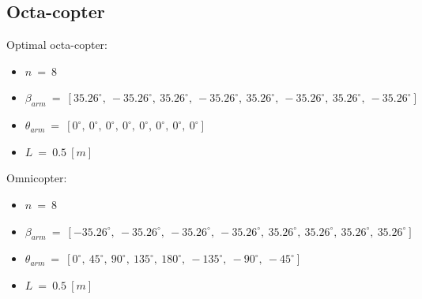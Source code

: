 \begin{table}[!h]
\begin{center}
 \caption{Comparison between two designs' hover capabilities.}\vspace{1ex}
 \label{tab:tab_Hexa_compare_hover}
\end{center}
\end{table}

\subsection{Octa-copter}
\label{sec:octa_copter}

Optimal octa-copter:
\begin{itemize}
  \item $n\ =\ 8$
  \item $\beta_{arm}\ =\ [35.26^{\circ},\  -35.26^{\circ},\  35.26^{\circ},\  -35.26^{\circ},\
                          35.26^{\circ},\  -35.26^{\circ},\ 35.26^{\circ},\  -35.26^{\circ}]$
  \item $\theta_{arm}\ =\ [0^{\circ},\  0^{\circ},\  0^{\circ},\  0^{\circ},\ 0^{\circ},\  0^{\circ},\ 0^{\circ},\  0^{\circ}]$
  \item $L\ =\ 0.5\ [m]$
\end{itemize}

Omnicopter:
\begin{itemize}
  \item $n\ =\ 8$
  \item $\beta_{arm}\ =\ [-35.26^{\circ},\  -35.26^{\circ},\  -35.26^{\circ},\  -35.26^{\circ},\
                          35.26^{\circ},\  35.26^{\circ},\ 35.26^{\circ},\  35.26^{\circ}]$
  \item $\theta_{arm}\ =\ [0^{\circ},\  45^{\circ},\  90^{\circ},\  135^{\circ},\
                          180^{\circ},\  -135^{\circ},\ -90^{\circ},\  -45^{\circ}]$
  \item $L\ =\ 0.5\ [m]$
\end{itemize}

